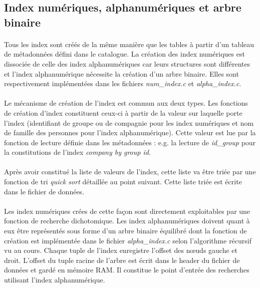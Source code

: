 \documentclass{article}
\begin{document}
    \subsection{Index numériques, alphanumériques et arbre binaire}
    \paragraph{}
    Tous les index sont créés de la même manière que les tables à partir d'un tableau de métadonnées défini dans le catalogue. La création des index numériques est dissociée de celle des index alphanumériques car leurs structures sont différentes et l'index alphanumérique nécessite la création d'un arbre binaire. Elles sont respectivement implémentées dans les fichiers \emph{num\_index.c} et \emph{alpha\_index.c}.

    \paragraph{}
    Le mécanisme de création de l'index est commun aux deux types. Les fonctions de création d'index constituent ceux-ci à partir de la valeur sur laquelle porte l'index (identifiant de groupe ou de compagnie pour les index numériques et nom de famille des personnes pour l'index alphanumérique). Cette valeur est lue par la fonction de lecture définie dans les métadonnées : e.g. la lecture de \emph{id\_group} pour la constitutions de l'index \emph{company by group id}.

    \paragraph{}
    Après avoir constitué la liste de valeurs de l'index, cette liste va être triée par une fonction de tri \emph{quick sort} détaillée au point suivant. Cette liste triée est écrite dans le fichier de données.

    \paragraph{}
    Les index numériques crées de cette façon sont directement exploitables par une fonction de recherche dichotomique. Les index alphanumériques doivent quant à eux être représentés sous forme d'un arbre binaire équilibré dont la fonction de création est implémentée dans le fichier \emph{alpha\_index.c} selon l'algorithme récursif vu au cours. Chaque tuple de l'index enregistre l'offset des n\oe uds gauche et droit. L'offset du tuple racine de l'arbre est écrit dans le header du fichier de données et gardé en mémoire RAM. Il constitue le point d'entrée des recherches utilisant l'index alphanumérique.
\end{document}
